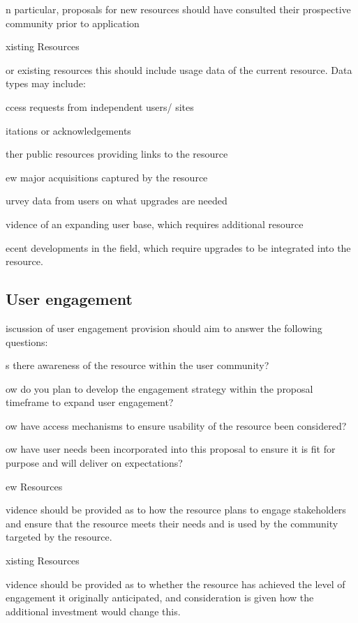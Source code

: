 \documentclass[a4paper,11point]{article}
\def\ii#1\par{{\color{blue!40}\sl #1}\par}
\def\iibf#1\par{{\color{blue!40}\sl\bfseries #1}\par}
\def\iitem#1\par{\ii\begin{itemize}[nosep]\item #1 \end{itemize}\par}
\begin{document}
\ii In particular, proposals for new resources should have consulted their prospective community prior to application

\iibf Existing Resources

\ii For existing resources this should include usage data of the
current resource. Data types may include: 

\iitem Access requests from independent users/ sites 

\iitem Citations or acknowledgements 

\iitem Other public resources providing links to the resource 

\iitem New major acquisitions captured by the resource 

\ii{Additionally, existing resources need 
to evidence why this resource needs 
to be maintained/updated by the 
current grant. This could include: }

\iitem Survey data from users on what upgrades are needed 

\iitem Evidence of an expanding 
user base, which requires 
additional resource 

\iitem Recent developments in the 
field, which require upgrades 
to be integrated into the 
resource. 


\subsection{User engagement}
\ii Discussion of user engagement provision should aim to answer the following 
questions:

\iitem Is there awareness of the resource within the user community?

\iitem How do you plan to develop the engagement strategy within the 
proposal timeframe to expand user engagement? 

\iitem How have access mechanisms to ensure usability of the resource 
been considered? 

\iitem How have user needs been incorporated into this proposal to ensure 
it is fit for purpose and will deliver on expectations? 

\iibf New Resources
  
\ii Evidence should be provided as to how the resource plans to engage
stakeholders and ensure that the resource meets their needs and is
used by the community targeted by the resource.

\iibf Existing Resources

\ii Evidence should be provided as to whether the resource has
achieved the level of engagement it originally anticipated, and
consideration is given how the additional investment would change
this.  
\end{document}
